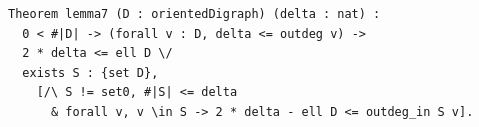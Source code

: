 \begin{lstlisting}[language=Rocq]
Theorem lemma7 (D : orientedDigraph) (delta : nat) :
  0 < #|D| -> (forall v : D, delta <= outdeg v) ->
  2 * delta <= ell D \/
  exists S : {set D},
    [/\ S != set0, #|S| <= delta
      & forall v, v \in S -> 2 * delta - ell D <= outdeg_in S v].
\end{lstlisting}

